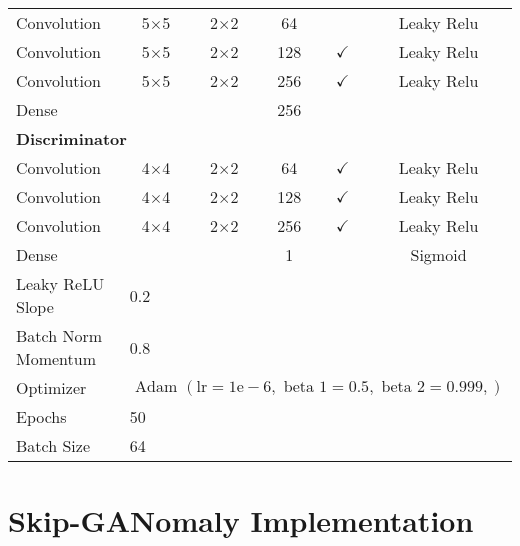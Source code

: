 \begin{table}[]
{\begin{tabular}{llcccc}
			Convolution & \multicolumn{1}{c}{5$\times$5} & 2$\times$2 & 64 &  & Leaky Relu \\
			Convolution & \multicolumn{1}{c}{5$\times$5} & 2$\times$2 & 128 & $\checkmark$ & Leaky Relu \\
			Convolution & \multicolumn{1}{c}{5$\times$5} & 2$\times$2 & 256 & $\checkmark$ & Leaky Relu \\
			Dense & \multicolumn{1}{c}{} &  & 256 &  &  \\ 
			\multicolumn{6}{l}{\textbf{Discriminator}} \\
			Convolution & \multicolumn{1}{c}{4$\times$4} & 2$\times$2 & 64 & $\checkmark$ & Leaky Relu \\
			Convolution & \multicolumn{1}{c}{4$\times$4} & 2$\times$2 & 128 & $\checkmark$ & Leaky Relu \\
			Convolution & \multicolumn{1}{c}{4$\times$4} & 2$\times$2 & 256 & $\checkmark$ & Leaky Relu \\
			Dense & \multicolumn{1}{c}{} &  & 1 &  & Sigmoid \\ \hline
			Leaky ReLU Slope & \multicolumn{5}{l}{0.2} \\
			Batch Norm Momentum & \multicolumn{5}{l}{0.8} \\
			Optimizer & \multicolumn{5}{l}{$\text { Adam }(\mathrm{lr}=1 \mathrm{e}-6, \text { beta } 1=0.5, \text { beta } 2=0.999,)$} \\ \hline
			Epochs & 50 & \multicolumn{1}{l}{} & \multicolumn{1}{l}{} & \multicolumn{1}{l}{} & \multicolumn{1}{l}{} \\
			Batch Size & \multicolumn{5}{l}{64}
		\end{tabular}%
	}
\end{table}

\section{Skip-GANomaly Implementation}

